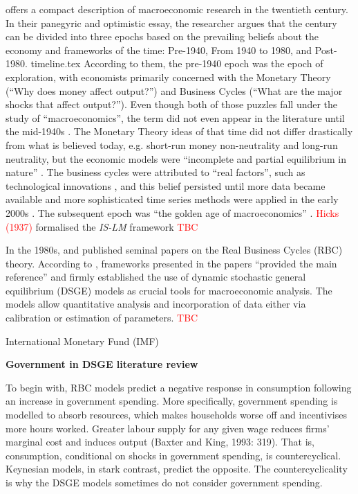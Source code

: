 \textcite{blanchard_2000_what} offers a compact description of macroeconomic research in the twentieth century. In their panegyric and optimistic essay, the researcher argues that the century can be divided into three epochs based on the prevailing beliefs about the economy and frameworks of the time: Pre-1940, From 1940 to 1980, and Post-1980. 
{timeline.tex}
According to them, the pre-1940 epoch was the epoch of exploration, with economists primarily concerned with the Monetary Theory (``Why does money affect output?'') and Business Cycles (``What are the major shocks that affect output?''). Even though both of those puzzles fall under the study of ``macroeconomics'', the term did not even appear in the literature until the mid-1940s \parencite{blanchard_2000_what}. The Monetary Theory ideas of that time did not differ drastically from what is believed today, e.g. short-run money non-neutrality and long-run neutrality, but the economic models were ``incomplete and partial equilibrium in nature'' \parencite[1377]{blanchard_2000_what}. The business cycles were attributed to ``real factors'', such as technological innovations \parencite{blanchard_2000_what}, and this belief persisted until more data became available and more sophisticated time series methods were applied in the early 2000s \parencite[3]{jordigal_2015_monetary}. The subsequent epoch was ``the golden age of macroeconomics'' \parencite[1379]{blanchard_2000_what}. \textcolor{red}{Hicks (1937)} formalised the \textit{IS-LM} framework \textcolor{red}{TBC}

In the 1980s, \textcite{kydland_1982_time} and \textcite{prescott_1986_theory} published seminal papers on the Real Business Cycles (RBC) theory. According to \textcite[2]{jordigal_2015_monetary}, frameworks presented in the papers ``provided the main reference'' and firmly established the use of dynamic stochastic general equilibrium (DSGE) models as crucial tools for macroeconomic analysis. The models allow quantitative analysis and incorporation of data either via calibration or estimation of parameters. \textcolor{red}{TBC}

International Monetary Fund (IMF)

\textbf{Government in DSGE literature review}

To begin with, RBC models predict a negative response in consumption following an increase in government spending. More specifically, government spending is modelled to absorb resources, which makes households worse off and incentivises more hours worked. Greater labour supply for any given wage reduces firms' marginal cost and induces output (Baxter and King, 1993: 319). That is, consumption, conditional on shocks in government spending, is countercyclical. Keynesian models, in stark contrast, predict the opposite. The countercyclicality is why the DSGE models sometimes do not consider government spending. 

